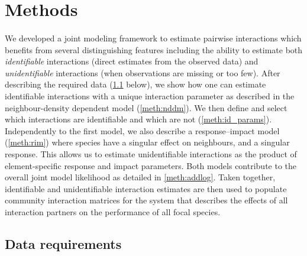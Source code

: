 \documentclass[a4,12pt]{article}
\begin{document}
\section{Methods}

\paragraph{} 
We developed a joint modeling framework to estimate pairwise interactions which benefits from several distinguishing features including the ability to estimate both \textit{identifiable} interactions (direct estimates from the observed data) and \textit{unidentifiable} interactions (when observations are missing or too few). After describing the required data (\ref{meth:data} below), we show how one can estimate identifiable interactions with a unique interaction parameter as described in the neighbour-density dependent model (\ref{meth:nddm}).
We then define and select which interactions are identifiable and which are not (\ref{meth:id_params}). Independently to the first model, we also describe a response--impact model (\ref{meth:rim}) where species have a singular effect on neighbours, and a singular response. This allows us to estimate unidentifiable interactions as the product of element-specific response and impact parameters. Both models contribute to the overall joint model likelihood as detailed in \ref{meth:addlog}.
Taken together, identifiable and unidentifiable interaction estimates are then used to populate community interaction matrices for the system that describes the effects of all interaction partners on the performance of all focal species. 




    \subsection{Data requirements}
    \label{meth:data}
\end{document}

